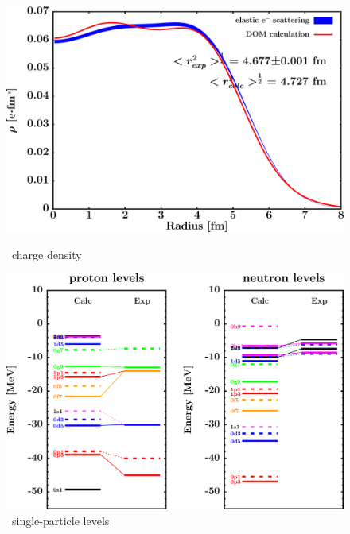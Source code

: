 \begin{figure}[hbtp]
    \centering
    \begin{minipage}{0.42\textwidth}
        \centering
        \includegraphics[width=\textwidth]{figures/sn124_chargeDensity.png}
        \caption*{\snFour\ charge density}
        \label{DOMFitData_sn124_chargeDensity}
    \end{minipage}\hspace{6pt}
    \begin{minipage}{0.42\textwidth}
        \centering
        \includegraphics[width=\textwidth]{figures/sn124_SPLevels.png}
        \caption*{\snFour\ single-particle levels}
        \label{DOMFitData_sn124_SPLevels}
    \end{minipage}
\end{figure}
